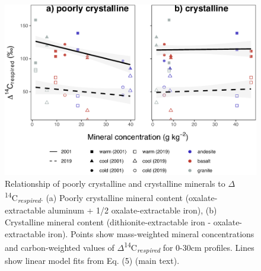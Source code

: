 \documentclass[english,man,floatsintext]{apa6}
\begin{document}
\begin{figure}

{\centering \includegraphics{sra-blk-inc-SI_files/figure-latex/min-inc30-plot-1} 

}

\caption{Relationship of poorly crystalline and crystalline minerals to \(\Delta\)\textsuperscript{14}C\textsubscript{\emph{respired}}. (a) Poorly crystalline mineral content (oxalate-extractable aluminum + 1/2 oxalate-extractable iron), (b) Crystalline mineral content (dithionite-extractable iron - oxalate-extractable iron). Points show mass-weighted mineral concentrations and carbon-weighted values of \(\Delta\)\textsuperscript{14}C\textsubscript{\emph{respired}} for 0-30cm profiles. Lines show linear model fits from Eq. (5) (main text).}\label{fig:min-inc30-plot}
\end{figure}


\clearpage
\renewcommand{\listfigurename}{Figure captions}

\clearpage
\renewcommand{\listtablename}{Table captions}
\end{document}
